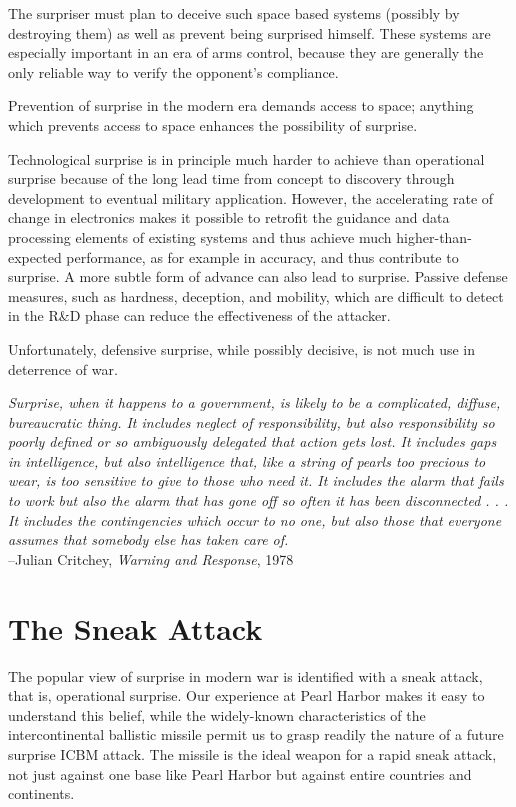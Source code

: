 The surpriser must plan to deceive such space based systems (possibly by destroying them) as well as prevent being surprised himself. These systems are especially important in an era of arms control, because they are generally the only reliable way to verify the opponent's compliance.

Prevention of surprise in the modern era demands access to space; anything which prevents access to space enhances the possibility of surprise.

Technological surprise is in principle much harder to achieve than operational surprise because of the long lead time from concept to discovery through development to eventual military application. However, the accelerating rate of change in electronics makes it possible to retrofit the guidance and data processing elements of existing systems and thus achieve much higher-than-expected performance, as for example in accuracy, and thus contribute to surprise. A more subtle form of advance can also lead to surprise. Passive defense measures, such as hardness, deception, and mobility, which are difficult to detect in the R\&D phase can reduce the effectiveness of the attacker.

Unfortunately, defensive surprise, while possibly decisive, is not much use in deterrence of war.

\begin{mdframed}[backgroundcolor=black!10, frametitle={AFTERTHOUGHT FOR THE DAY}]
    \textit{Surprise, when it happens to a government, is likely to be a complicated, diffuse, bureaucratic thing. It includes neglect of responsibility, but also responsibility so poorly defined or so ambiguously delegated that action gets lost. It includes gaps in intelligence, but also intelligence that, like a string of pearls too precious to wear, is too sensitive to give to those who need it. It includes the alarm that fails to work but also the alarm that has gone off so often it has been disconnected . . . It includes the contingencies which occur to no one, but also those that everyone assumes that somebody else has taken care of.} \\
    --Julian Critchey, \textit{Warning and Response}, 1978
\end{mdframed}

\section{The Sneak Attack}
The popular view of surprise in modern war is identified with a sneak attack, that is, operational surprise. Our experience at Pearl Harbor makes it easy to understand this belief, while the widely-known characteristics of the intercontinental ballistic missile permit us to grasp readily the nature of a future surprise ICBM attack. The missile is the ideal weapon for a rapid sneak attack, not just against one base like Pearl Harbor but against entire countries and continents.

